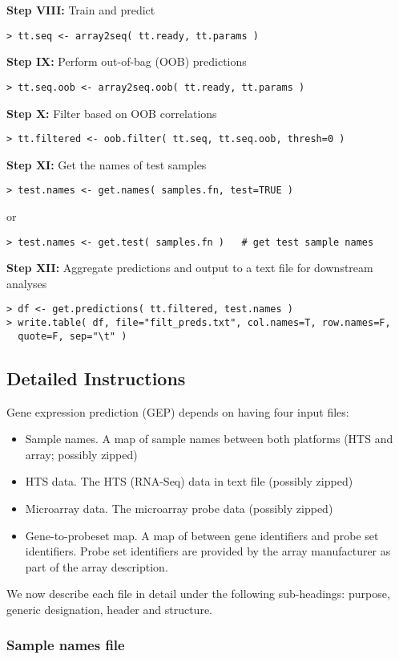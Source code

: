 \documentclass[a4paper,12pt]{article}
\begin{document}
\textbf{Step VIII:} Train and predict
\begin{verbatim}
> tt.seq <- array2seq( tt.ready, tt.params )
\end{verbatim}
\textbf{Step IX:} Perform out-of-bag (OOB) predictions
\begin{verbatim}
> tt.seq.oob <- array2seq.oob( tt.ready, tt.params )
\end{verbatim}
\textbf{Step X:} Filter based on OOB correlations
\begin{verbatim}
> tt.filtered <- oob.filter( tt.seq, tt.seq.oob, thresh=0 )
\end{verbatim}
\textbf{Step XI:} Get the names of test samples
\begin{verbatim}
> test.names <- get.names( samples.fn, test=TRUE )
\end{verbatim}
or 
\begin{verbatim}
> test.names <- get.test( samples.fn )   # get test sample names
\end{verbatim}
\textbf{Step XII:} Aggregate predictions and output to a text file for downstream analyses
\begin{verbatim}
> df <- get.predictions( tt.filtered, test.names )
> write.table( df, file="filt_preds.txt", col.names=T, row.names=F, 
  quote=F, sep="\t" )
\end{verbatim}

\subsection{Detailed Instructions}
\label{gep:detailed}
Gene expression prediction (GEP) depends on having four input files:
\begin{itemize}
\item Sample names. A map of sample names between both platforms (HTS and array; possibly zipped)
\item HTS data. The HTS (RNA-Seq) data in text file (possibly zipped)
\item Microarray data. The microarray probe data (possibly zipped) 
\item Gene-to-probeset map. A map of between gene identifiers and probe set identifiers. Probe set identifiers are provided by the array manufacturer as part of the array description.
\end{itemize}

We now describe each file in detail under the following sub-headings: purpose, generic designation, header and structure.

\subsubsection{Sample names file}
\label{gep:sample}
\end{document}
